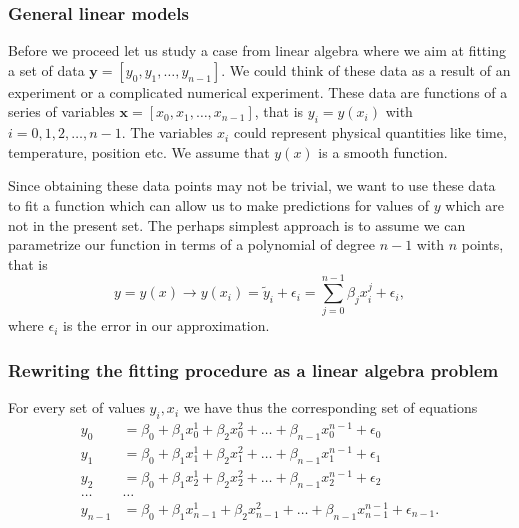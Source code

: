 \documentclass{beamer}
\begin{document}
\begin{frame}
\frametitle{General linear models}

\begin{block}{}
Before we proceed let us study a case from linear algebra where we aim at fitting a set of data $\bm{y}=[y_0,y_1,\dots,y_{n-1}]$. We could think of these data as a result of an experiment or a complicated numerical experiment. These data are functions of a series of variables $\bm{x}=[x_0,x_1,\dots,x_{n-1}]$, that is $y_i = y(x_i)$ with $i=0,1,2,\dots,n-1$. The variables $x_i$ could represent physical quantities like time, temperature, position etc. We assume that $y(x)$ is a smooth function. 

Since obtaining these data points may not be trivial, we want to use these data to fit a function which can allow us to make predictions for values of $y$ which are not in the present set. The perhaps simplest approach is to assume we can parametrize our function in terms of a polynomial of degree $n-1$ with $n$ points, that is
\[
y=y(x) \rightarrow y(x_i)=\tilde{y}_i+\epsilon_i=\sum_{j=0}^{n-1} \beta_j x_i^j+\epsilon_i,
\]
where $\epsilon_i$ is the error in our approximation. 

\end{block}
\end{frame}

\begin{frame}
\frametitle{Rewriting the fitting procedure as a linear algebra problem}

\begin{block}{}
For every set of values $y_i,x_i$ we have thus the corresponding set of equations
\begin{align*}
y_0&=\beta_0+\beta_1x_0^1+\beta_2x_0^2+\dots+\beta_{n-1}x_0^{n-1}+\epsilon_0\\
y_1&=\beta_0+\beta_1x_1^1+\beta_2x_1^2+\dots+\beta_{n-1}x_1^{n-1}+\epsilon_1\\
y_2&=\beta_0+\beta_1x_2^1+\beta_2x_2^2+\dots+\beta_{n-1}x_2^{n-1}+\epsilon_2\\
\dots & \dots \\
y_{n-1}&=\beta_0+\beta_1x_{n-1}^1+\beta_2x_{n-1}^2+\dots+\beta_{n-1}x_{n-1}^{n-1}+\epsilon_{n-1}.\\
\end{align*}
\end{block}
\end{frame}
\end{document}
